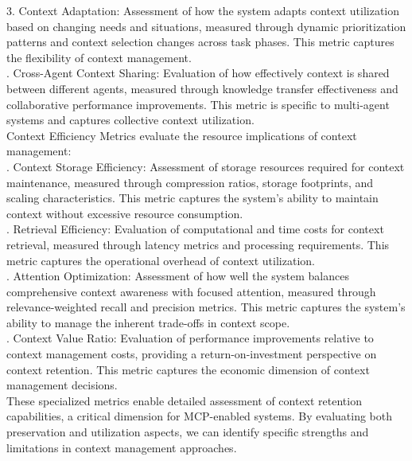 3. Context Adaptation: Assessment of how the system adapts context utilization based on changing needs and situations, measured through dynamic prioritization patterns and context selection changes across task phases. This metric captures the flexibility of context management.\\ . Cross-Agent Context Sharing: Evaluation of how effectively context is shared between different agents, measured through knowledge transfer effectiveness and collaborative performance improvements. This metric is specific to multi-agent systems and captures collective context utilization.\\ \newline
Context Efficiency Metrics evaluate the resource implications of context management:\\ . Context Storage Efficiency: Assessment of storage resources required for context maintenance, measured through compression ratios, storage footprints, and scaling characteristics. This metric captures the system's ability to maintain context without excessive resource consumption.\\ . Retrieval Efficiency: Evaluation of computational and time costs for context retrieval, measured through latency metrics and processing requirements. This metric captures the operational overhead of context utilization.\\ . Attention Optimization: Assessment of how well the system balances comprehensive context awareness with focused attention, measured through relevance-weighted recall and precision metrics. This metric captures the system's ability to manage the inherent trade-offs in context scope.\\ . Context Value Ratio: Evaluation of performance improvements relative to context management costs, providing a return-on-investment perspective on context retention. This metric captures the economic dimension of context management decisions.\\ \newline
These specialized metrics enable detailed assessment of context retention capabilities, a critical dimension for MCP-enabled systems. By evaluating both preservation and utilization aspects, we can identify specific strengths and limitations in context management approaches.\\
